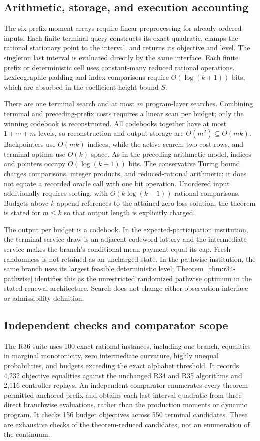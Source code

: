 \subsection{Arithmetic, storage, and execution accounting}
The six prefix-moment arrays require linear preprocessing for already ordered inputs. Each finite terminal query constructs its exact quadratic, clamps the rational stationary point to the interval, and returns its objective and level. The singleton last interval is evaluated directly by the same interface. Each finite prefix or deterministic cell uses constant-many reduced rational operations. Lexicographic padding and index comparisons require $O(\log(k+1))$ bits, which are absorbed in the coefficient-height bound $S$.

There are one terminal search and at most $m$ program-layer searches. Combining terminal and preceding-prefix costs requires a linear scan per budget; only the winning codebook is reconstructed. All codebooks together have at most $1+\cdots+m$ levels, so reconstruction and output storage are $O(m^2)\subseteq O(mk)$. Backpointers use $O(mk)$ indices, while the active search, two cost rows, and terminal optima use $O(k)$ space. As in the preceding arithmetic model, indices and pointers occupy $O(\log(k+1))$ bits. The conservative Turing bound charges comparisons, integer products, and reduced-rational arithmetic; it does not equate a recorded oracle call with one bit operation. Unordered input additionally requires sorting, with $O(k\log(k+1))$ rational comparisons. Budgets above $k$ append references to the attained zero-loss solution; the theorem is stated for $m\leq k$ so that output length is explicitly charged.

The output per budget is a codebook. In the expected-participation institution, the terminal service draw is an adjacent-codeword lottery and the intermediate service makes the branch's conditional-mean payment equal its cap. Fresh randomness is not retained as an uncharged state. In the pathwise institution, the same branch uses its largest feasible deterministic level; Theorem~\ref{thm:r34-pathwise} identifies this as the unrestricted randomized pathwise optimum in the stated renewal architecture. Search does not change either observation interface or admissibility definition.

\subsection{Independent checks and comparator scope}
The R36 suite uses 100 exact rational instances, including one branch, equalities in marginal monotonicity, zero intermediate curvature, highly unequal probabilities, and budgets exceeding the exact alphabet threshold. It records 4,232 objective equalities against the unchanged R34 and R35 algorithms and 2,116 controller replays. An independent comparator enumerates every theorem-permitted anchored prefix and obtains each last-interval quadratic from three direct branchwise evaluations, rather than the production moments or dynamic program. It checks 156 budget objectives across 550 terminal candidates. These are exhaustive checks of the theorem-reduced candidates, not an enumeration of the continuum.


